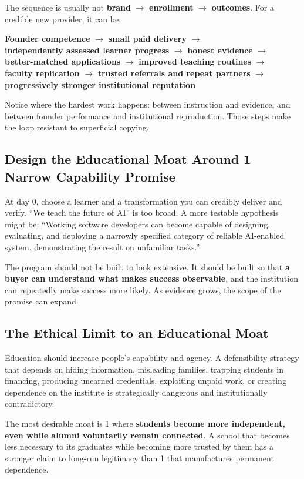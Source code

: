 The sequence is usually not \textbf{brand} $\to$ \textbf{enrollment} $\to$ \textbf{outcomes}. For a credible new provider, it can be:
\begin{center}
\small
\textbf{Founder competence} $\to$ \textbf{small paid delivery} $\to$ \\
\textbf{independently assessed learner progress} $\to$ \textbf{honest evidence} $\to$ \\
\textbf{better-matched applications} $\to$ \textbf{improved teaching routines} $\to$ \\
\textbf{faculty replication} $\to$ \textbf{trusted referrals and repeat partners} $\to$ \\
\textbf{progressively stronger institutional reputation}
\end{center}

Notice where the hardest work happens: between instruction and evidence, and between founder performance and institutional reproduction. Those steps make the loop resistant to superficial copying.

\subsection{Design the Educational Moat Around 1 Narrow Capability Promise}
\label{sec:design_moat_narrow_capability_promise}

At day 0, choose a learner and a transformation you can credibly deliver and verify. ``We teach the future of AI'' is too broad. A more testable hypothesis might be: ``Working software developers can become capable of designing, evaluating, and deploying a narrowly specified category of reliable AI-enabled system, demonstrating the result on unfamiliar tasks.''

The program should not be built to look extensive. It should be built so that \textbf{a buyer can understand what makes success observable}, and the institution can repeatedly make success more likely. As evidence grows, the scope of the promise can expand.

\subsection{The Ethical Limit to an Educational Moat}
\label{sec:ethical_limit_educational_moat}

Education should increase people's capability and agency. A defensibility strategy that depends on hiding information, misleading families, trapping students in financing, producing unearned credentials, exploiting unpaid work, or creating dependence on the institute is strategically dangerous and institutionally contradictory.

The most desirable moat is 1 where \textbf{students become more independent, even while alumni voluntarily remain connected}. A school that becomes less necessary to its graduates while becoming more trusted by them has a stronger claim to long-run legitimacy than 1 that manufactures permanent dependence.
